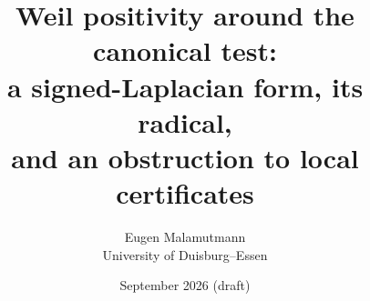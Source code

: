 \documentclass[11pt,a4paper]{article}
\title{Weil positivity around the canonical test:\\ a signed-Laplacian form, its radical,\\ and an obstruction to local certificates}
\author{Eugen Malamutmann\\ \small University of Duisburg--Essen}
\date{September 2026 \quad (draft)}
\theoremstyle{plain}
\theoremstyle{definition}
\begin{document}
\maketitle
\begin{abstract}\end{abstract}








\appendix



\end{document}
